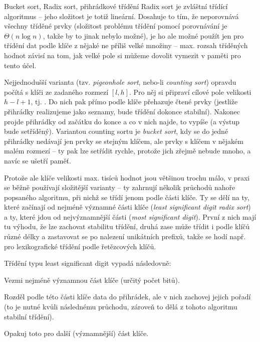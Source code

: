 \begin{algoritmusN}{Bucket sort, Radix sort, přihrádkové třídění}
Radix sort je zvláštní třídící algoritmus -- jeho složitost je totiž lineární. Dosahuje to tím, že neporovnává všechny tříděné prvky (složitost problému třídění pomocí porovnávání je $\Theta(n\log n)$, takže by to jinak nebylo možné), je ho ale možné použít jen pro třídění dat podle klíče z nějaké ne příliš velké množiny -- max. rozsah tříděných hodnot závisí na tom, jak velké pole si můžeme dovolit vymezit v paměti pro tento účel.

Nejjednodušší varianta (tzv. \emph{pigeonhole sort}, nebo-li \emph{counting sort}) opravdu počítá s klíči ze zadaného rozmezí $[l,h]$. Pro něj si připraví cílové pole velikosti $h-l+1$, tj. . Do nich pak přímo podle klíče přehazuje čtené prvky (jestliže přihrádky realizujeme jako seznamy, bude třídění dokonce stabilní). Nakonec projde přihrádky od začátku do konce a co v nich najde, to vypíše (a výstup bude setříděný). Variantou counting sortu je \emph{bucket sort}, kdy se do jedné přihrádky nedávají jen prvky se stejným klíčem, ale prvky s klíčem v nějakém malém rozmezí -- ty pak lze setřídit rychle, protože jich zřejmě nebude mnoho, a navíc se ušetří paměť.


Protože ale klíče velikosti max. tisíců hodnot jsou většinou trochu málo, v praxi se běžně používají složitější varianty -- ty zahrnují několik průchodů nahoře popsaného algoritmu, při nichž se třídí jenom podle části klíče. Ty se dělí na ty, které začínají od nejméně významné části klíče (\emph{least significant digit radix sort}) a ty, které jdou od nejvýznamnější části (\emph{most significant digit}). První z nich mají tu výhodu, že lze zachovat stabilitu třídění, druhá zase může třídit i podle klíčů různé délky a zastavovat se po nalezení unikátních prefixů, takže se hodí např. pro lexikografické třídění podle řetězcových klíčů.

Třídění typu least significant digit vypadá následovně:
\begin{penumerate}
    \item Vezmi nejméně významnou část klíče (určitý počet bitů).
    \item Rozděl podle této části klíče data do přihrádek, ale v nich zachovej jejich pořadí (to je nutné kvůli následnému průchodu, zároveň to dělá z tohoto algoritmu stabilní třídění).
    \item Opakuj toto pro další (významnější) část klíče.
\end{penumerate}


\end{algoritmusN}
